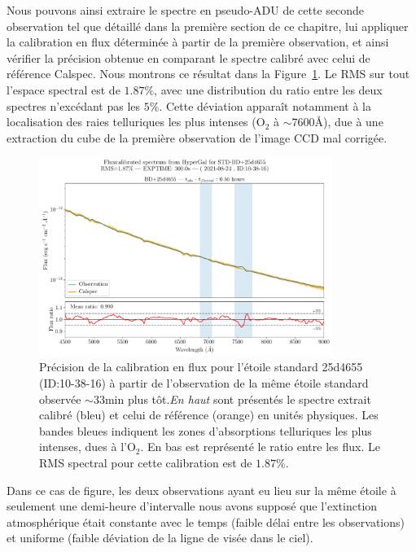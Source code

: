 \documentclass[../main/main.tex]{subfiles}
\begin{document}
Nous pouvons ainsi extraire le spectre en pseudo-ADU de cette seconde
observation tel que détaillé dans la première section de ce chapitre,
lui appliquer la calibration en flux déterminée à partir de la première
observation, et ainsi vérifier la précision obtenue en comparant le
spectre calibré avec celui de référence Calspec.
Nous montrons ce résultat dans la Figure~\ref{fig:fluxcalstd}.
Le RMS sur tout l'espace spectral est de $1.87\%$, avec une distribution
du ratio entre les deux spectres n'excédant pas les $5\%$. Cette
déviation apparaît notamment à la localisation des raies telluriques les
plus intenses (O$_{2}$ à $\sim7600$\AA), due à une extraction du cube de
la première observation de l'image CCD mal corrigée.

\begin{figure}[ht]
  \centering
  \includegraphics[width=0.85\textwidth]{../figures/06_irf/fluxcalstd.pdf}
  \caption[Précision de la calibration en flux pour une étoile
  standard.]{Précision de la calibration en flux pour l'étoile standard
    25d4655 (ID:10-38-16) à partir de l'observation de la même étoile standard
    observée $\sim33$min plus tôt.\emph{En haut} sont présentés le
    spectre extrait calibré (bleu) et celui de référence (orange) en
    unités physiques. Les bandes bleues indiquent les zones
    d'absorptions telluriques les plus intenses, dues à l'O$_{2}$. En
    bas est représenté le ratio entre les flux. Le RMS spectral pour
    cette calibration est de $1.87\%$.}
  \label{fig:fluxcalstd}
\end{figure}


Dans ce cas de figure, les deux observations ayant eu lieu sur la même
étoile à seulement une demi-heure d'intervalle nous avons supposé que
l'extinction atmosphérique était constante avec le temps (faible délai
entre les observations) et uniforme (faible déviation de la ligne de
visée dans le ciel).
\end{document}
